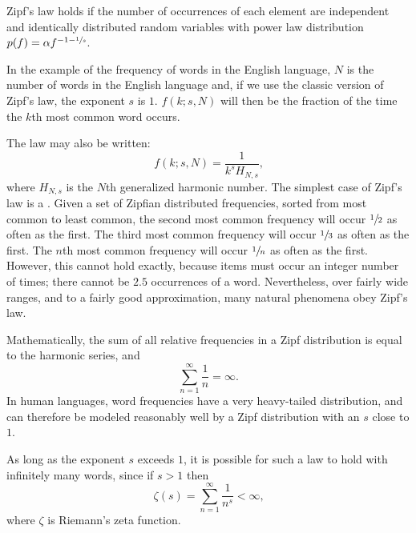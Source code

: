      Zipf's law holds if the number of occurrences of each element are independent and identically distributed random variables with power law distribution $p(f) = \alpha f^{-1-\sfrac{1}{s}}$\cite{AdamicHuberman2002}.

      In the example of the frequency of words in the English language, $N$ is the number of words in the English language and, if we use the classic version of Zipf's law, the exponent $s$ is $1$. $f(k; s,N)$ will then be the fraction of the time the $k$th most common word occurs.

      The law may also be written:
      \begin{equation}
        f(k;s,N)=\frac{1}{k^s H_{N,s}}\mbox{,}
      \end{equation}
      where $H_{N,s}$ is the $N$th generalized harmonic number.
The simplest case of Zipf's law is a . Given a set of Zipfian distributed frequencies, sorted from most common to least common, the second most common frequency will occur $\sfrac{1}{2}$ as often as the first. The third most common frequency will occur $\sfrac{1}{3}$ as often as the first. The $n$th most common frequency will occur $\sfrac{1}{n}$ as often as the first. However, this cannot hold exactly, because items must occur an integer number of times; there cannot be $2.5$ occurrences of a word. Nevertheless, over fairly wide ranges, and to a fairly good approximation, many natural phenomena obey Zipf's law.

      Mathematically, the sum of all relative frequencies in a Zipf distribution is equal to the harmonic series, and
      \begin{equation}
        \sum_{n=1}^\infty \frac{1}{n}=\infty\mbox{.}
      \end{equation}
      In human languages, word frequencies have a very heavy-tailed distribution, and can therefore be modeled reasonably well by a Zipf distribution with an $s$ close to $1$.

      As long as the exponent $s$ exceeds $1$, it is possible for such a law to hold with infinitely many words, since if $s > 1$ then
      \begin{equation}
        \zeta (s) = \sum_{n=1}^\infty \frac{1}{n^s}<\infty\mbox{,}
      \end{equation}
      where $\zeta$ is Riemann's zeta function.
      
